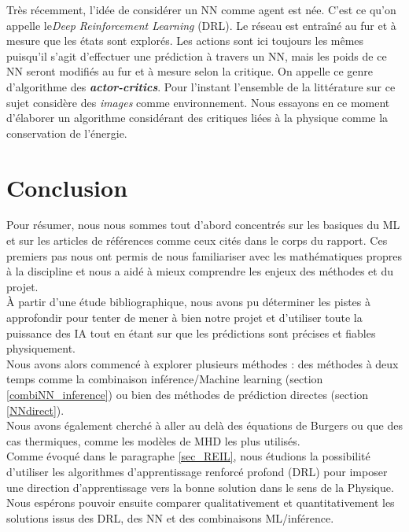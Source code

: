 \documentclass[a4paper,12pt]{article}
\newcommand\bk{\color{black}}
\newcommand\navy{\color{navy}}
\numberwithin{equation}{section} %
\begin{document}
\noindent Très récemment, l'idée de considérer un NN comme agent est née. C'est ce qu'on appelle le\textit{Deep Reinforcement Learning} (DRL). Le réseau est entraîné au fur et à mesure que les états sont explorés. Les actions sont ici toujours les mêmes puisqu'il s'agit d'effectuer une prédiction à travers un NN, mais les poids de ce NN seront modifiés au fur et à mesure selon la critique. On appelle ce genre d'algorithme des \textbf{\textit{actor-critics}}.
\noindent Pour l'instant l'ensemble de la littérature sur ce sujet considère des \textit{images} comme environnement. Nous essayons en ce moment d'élaborer un algorithme considérant des critiques liées à la physique comme la conservation de l'énergie.

\pagebreak

\navy \section{Conclusion} \bk
\noindent Pour résumer, nous nous sommes tout d'abord concentrés sur les basiques du ML et sur les articles de références comme ceux cités dans le corps du rapport. Ces premiers pas nous ont permis de nous familiariser avec les mathématiques propres à la discipline et nous a aidé à mieux comprendre les enjeux des méthodes et du projet.\\
À partir d'une étude bibliographique, nous avons pu déterminer les pistes à approfondir pour tenter de mener à bien notre projet et d'utiliser toute la puissance des IA tout en étant sur que les prédictions sont précises et fiables physiquement.\\
Nous avons alors commencé à explorer plusieurs méthodes : des méthodes à deux temps comme la combinaison inférence/Machine learning (section \eqref{combiNN_inference}) ou bien des méthodes de prédiction directes (section \eqref{NNdirect}). \\
Nous avons également cherché à aller au delà des équations de Burgers ou que des cas thermiques, comme les modèles de MHD les plus utilisés.\\
	
\noindent Comme évoqué dans le paragraphe \eqref{sec_REIL}, nous étudions la possibilité d'utiliser les algorithmes d'apprentissage renforcé profond (DRL) pour imposer une direction d'apprentissage vers la bonne solution dans le sens de la Physique.\\
Nous espérons pouvoir ensuite comparer qualitativement et quantitativement les solutions issus des DRL, des NN et des combinaisons ML/inférence.\\





\pagebreak



\end{document}

